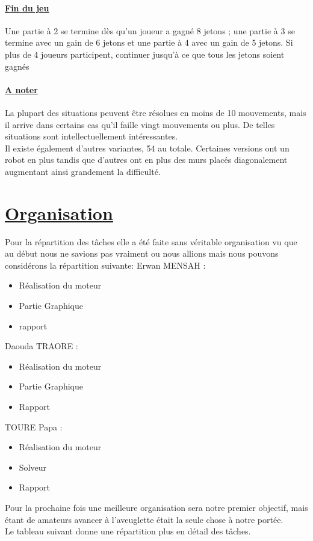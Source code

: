 \documentclass[12pt]{article}
\begin{document}
	\paragraph{\underline{Fin du jeu}\\}
	Une partie à 2 se termine dès qu’un joueur a gagné 8 jetons ; une partie à 3 se termine avec un
	gain de 6 jetons et une partie à 4 avec un gain de 5 jetons. Si plus de 4 joueurs participent,
	continuer jusqu’à ce que tous les jetons soient gagnés

	\paragraph{\underline{A noter}\\}
	La plupart des situations peuvent être résolues en moins de 10 mouvements, mais il arrive dans
	certains cas qu’il faille vingt mouvements ou plus. De telles situations sont intellectuellement
	intéressantes.\\
	Il existe également d'autres variantes, 54 au totale. Certaines versions ont un robot en plus tandis 
	que d'autres ont en plus des murs placés diagonalement augmentant ainsi grandement la difficulté.
\section{\underline{Organisation}}
	Pour la répartition des tâches elle a été faite sans véritable organisation vu que au début nous ne savions pas vraiment 
	ou nous allions mais nous pouvons considérons la répartition suivante:
	\newpage
	Erwan MENSAH :
	\begin{itemize}
	\item Réalisation du moteur
	\item Partie Graphique
	\item  rapport
	\end{itemize}
	Daouda TRAORE :
	\begin{itemize}
	\item Réalisation du moteur
	\item Partie Graphique
	\item  Rapport
	\end{itemize}
	TOURE Papa :
	\begin{itemize}
	\item Réalisation du moteur
	\item Solveur
	\item Rapport
	\end{itemize}
	Pour la prochaine fois une meilleure organisation sera notre premier objectif, mais étant de amateurs avancer à l'aveuglette
	était la seule chose à notre portée.\\
	Le tableau suivant  donne une répartition plus en détail des tâches.
\end{document}
